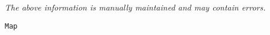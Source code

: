 \label{pkg:quickstring\_binary\_map}

{\tiny \it The above information is manually maintained and may contain errors.}
\begin{verbatim}
Map
\end{verbatim}
